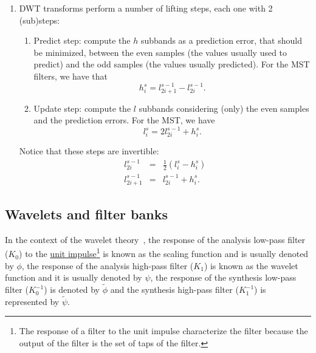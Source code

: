 \begin{enumerate}
\item DWT transforms perform a number of lifting steps, each one with
  2 (sub)steps:
  \begin{enumerate}
  \item Predict step: compute the $h$ subbands as a prediction error,
    that should be minimized, between the even samples (the values
    usually used to predict) and the odd samples (the values usually
    predicted). For the MST filters, we have that
    \begin{equation}
      h^s_i = l^{s-1}_{2i+1} - l^{s-1}_{2i}.
    \end{equation}
    
  \item Update step: compute the $l$ subbands considering (only) the even
    samples and the prediction errors. For the MST, we have
    \begin{equation}
      l^s_i = 2l^{s-1}_{2i} + h^s_i.
    \end{equation}
  \end{enumerate}

  Notice that these steps are invertible:
  \begin{equation}
    \begin{array}{rcl}
      l^{s-1}_{2i} & = & \frac{1}{2}(l^s_i - h^s_i)\\
      l^{s-1}_{2i+1} & = & l^{s-1}_{2i} + h^s_i.
    \end{array}
  \end{equation}

\end{enumerate}

\subsection{Wavelets and filter banks}
In the context of the wavelet theory~\cite{burrus2013wavelets}, the
response of the analysis low-pass filter ($K_0$) to the
\href{https://en.wikipedia.org/?title=Unit_impulse&redirect=no}{unit
  impulse}\footnote{The response of a filter to the unit impulse
  characterize the filter because the output of the filter is the set
  of taps of the filter.} is known as the scaling function and is
usually denoted by $\phi$, the response of the analysis high-pass
filter ($K_1$) is known as the wavelet function and it is usually
denoted by $\psi$, the response of the synthesis low-pass filter
($K^{-1}_0$) is denoted by $\tilde\phi$ and the synthesis high-pass
filter ($K^{-1}_1$) is represented by $\tilde\psi$.

